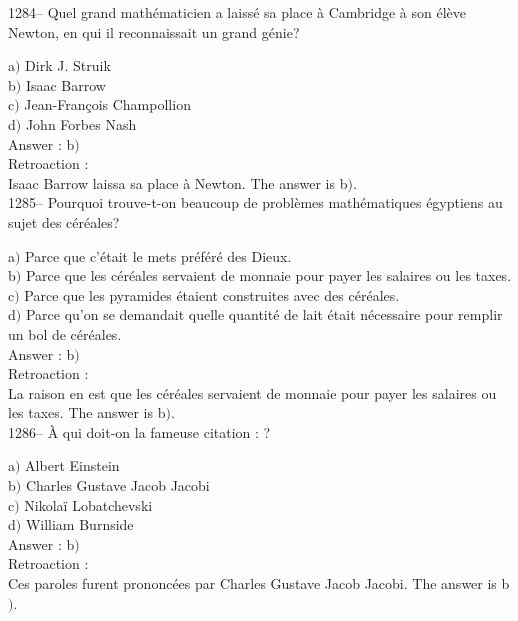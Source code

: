 ﻿\documentclass[letterpaper, 12pt]{article}
\begin{document}
1284-- Quel grand math\'ematicien a laiss\'e sa place \`a Cambridge
\`a son \'el\`eve Newton, en qui il reconnaissait un grand g\'enie?

a$)$ Dirk J. Struik \\
b$)$ Isaac Barrow \\
c$)$ Jean-Fran\c cois Champollion \\
d$)$ John Forbes Nash\\

Answer : b$)$\\

Retroaction : \\
Isaac Barrow laissa sa place \`a Newton.
The answer is  b$)$.\\

1285-- Pourquoi trouve-t-on beaucoup de probl\`emes math\'ematiques
\'egyptiens au sujet des c\'er\'eales?

a$)$ Parce que c'\'etait le mets pr\'ef\'er\'e des Dieux. \\
b$)$ Parce que les c\'er\'eales servaient de monnaie pour payer les salaires
ou les taxes. \\
c$)$ Parce que les pyramides \'etaient construites avec des c\'er\'eales. \\
d$)$ Parce qu'on se demandait quelle quantit\'e de lait \'etait n\'ecessaire
pour remplir un bol de c\'er\'eales. \\


Answer : b$)$\\

Retroaction : \\
La raison en est que les c\'er\'eales servaient de monnaie pour
payer les salaires ou les taxes.
The answer is  b$)$.\\

1286-- \`A qui doit-on la fameuse citation : \fg?

a$)$ Albert Einstein \\
b$)$ Charles Gustave Jacob Jacobi \\
c$)$ Nikola\"i Lobatchevski \\
d$)$ William Burnside\\

Answer : b$)$\\

Retroaction : \\
Ces paroles furent prononc\'ees par Charles Gustave Jacob Jacobi.
The answer is  b$)$.\\
\end{document}

